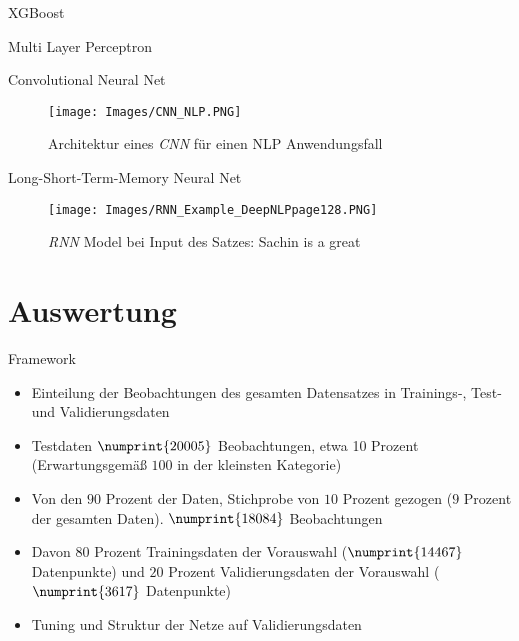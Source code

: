 \documentclass[8pt, xcolor = dvipsnames]{beamer}
\begin{document}
\begin{frame}{XGBoost}
    
\end{frame}{}


\begin{frame}{Multi Layer Perceptron}
    
\end{frame}{}

\begin{frame}{Convolutional Neural Net}
    
\begin{figure}[!ht]
\begin{center}
\texttt{[image: Images/CNN\_NLP.PNG]}
\caption{Architektur eines \textit{CNN} für einen NLP Anwendungsfall}
\label{abb:CNN_NLP}
\end{center}
\end{figure}
\end{frame}{}

\begin{frame}{Long-Short-Term-Memory Neural Net}
    \begin{figure}[!ht]
\begin{center}
\texttt{[image: Images/RNN\_Example\_DeepNLPpage128.PNG]}
\caption{\textit{RNN} Model bei Input des Satzes: Sachin is a great }
\label{abb:RNNExample}
\end{center}
\end{figure}
\end{frame}{}

\section{Auswertung}

\begin{frame}{Framework}
\begin{itemize}
    \item Einteilung der  Beobachtungen des gesamten Datensatzes in Trainings-, Test- und Validierungsdaten \item Testdaten $\numprint{20005}$ Beobachtungen, etwa 10 Prozent (Erwartungsgemäß $100$ in der kleinsten Kategorie)
    \item Von den $90$ Prozent der Daten, Stichprobe von $10$ Prozent gezogen ($9$ Prozent der gesamten Daten). $\numprint{18084}$ Beobachtungen
    \item Davon $80$ Prozent Trainingsdaten der Vorauswahl ($\numprint{14467}$ Datenpunkte) und $20$ Prozent  Validierungsdaten der Vorauswahl ($\numprint{3617}$ Datenpunkte)
    \item Tuning und Struktur der Netze auf Validierungsdaten
\end{itemize}{}
\end{frame}{}
\end{document}
